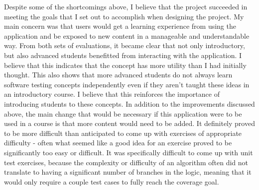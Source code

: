 \documentclass[10pt,twocolumn]{article}
\begin{document}
Despite some of the shortcomings above, I believe that the project succeeded in meeting the goals that I set out to 
accomplish when designing the project. My main concern was that users would get a learning experience from using the 
application and be exposed to new content in a manageable and understandable way. From both sets of evaluations, it 
became clear that not only introductory, but also advanced students benefitted from interacting with the application. 
I believe that this indicates that the concept has more utility than I had initially thought. This also shows that 
more advanced students do not always learn software testing concepts independently even if they aren't taught these ideas 
in an introductory course. I believe that this reinforces the importance of introducing students to these concepts. 
In addition to the improvements discussed above, the main change that would be necessary if this application were to be 
used in a course is that more content would need to be added. It definitely proved to be more difficult than anticipated 
to come up with exercises of appropriate difficulty - often what seemed like a good idea for an exercise proved to be 
significantly too easy or difficult. It was specifically difficult to come up with unit test exercises, because the 
complexity or difficulty of an algorithm often did not translate to having a significant number of branches in the logic, 
meaning that it would only require a couple test cases to fully reach the coverage goal. 


\printbibliography 
\end{document}
